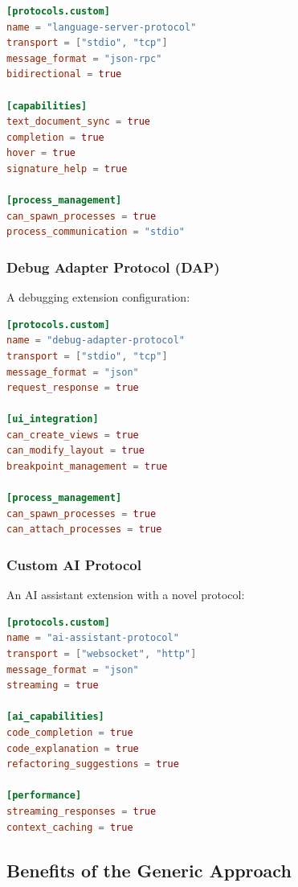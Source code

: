 \begin{lstlisting}[language=toml, caption=Language Server Protocol Configuration]
[protocols.custom]
name = "language-server-protocol"
transport = ["stdio", "tcp"]
message_format = "json-rpc"
bidirectional = true

[capabilities]
text_document_sync = true
completion = true
hover = true
signature_help = true

[process_management]
can_spawn_processes = true
process_communication = "stdio"
\end{lstlisting}

\subsubsection*{Debug Adapter Protocol (DAP)}

A debugging extension configuration:

\begin{lstlisting}[language=toml, caption=DAP Extension Configuration]
[protocols.custom]
name = "debug-adapter-protocol"
transport = ["stdio", "tcp"]
message_format = "json"
request_response = true

[ui_integration]
can_create_views = true
can_modify_layout = true
breakpoint_management = true

[process_management]
can_spawn_processes = true
can_attach_processes = true
\end{lstlisting}

\subsubsection*{Custom AI Protocol}

An AI assistant extension with a novel protocol:

\begin{lstlisting}[language=toml, caption=Custom AI Protocol Configuration]
[protocols.custom]
name = "ai-assistant-protocol"
transport = ["websocket", "http"]
message_format = "json"
streaming = true

[ai_capabilities]
code_completion = true
code_explanation = true
refactoring_suggestions = true

[performance]
streaming_responses = true
context_caching = true
\end{lstlisting}

\subsection*{Benefits of the Generic Approach}

